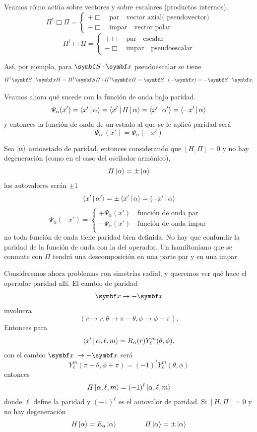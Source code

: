 \documentclass[10pt,oneside]{CBFT_book}
\begin{document}
Veamos cómo actúa sobre vectores y sobre escalares (productos internos),
\[
	\Pi^\dagger \Box \Pi =  \begin{cases} +{\Box} \quad \text{par}\quad\text{vector axial( 
	pseudovector)}\\  -\Box \quad \text{impar} \quad \text{vector polar} \end{cases}
\]
\[
	\Pi^\dagger \Box \Pi =  \begin{cases} +\Box \quad \text{par}\quad\text{escalar}\\
	-\Box \quad \text{impar} \quad \text{pseudoescalar} \end{cases}
\]

Así, por ejemplo, para $\vb{S}\cdot\vb{x}$ pseudoescalar se tiene
\[
	\Pi^\dagger \vb{S}\cdot\vb{x} \Pi = \Pi^\dagger \vb{S}\Pi \cdot\Pi^\dagger\vb{x} \Pi =
	\vb{S}\cdot(-\vb{x}) = -\vb{S}\cdot\vb{x}.
\]

Veamos ahora qué sucede con la función de onda bajo paridad.
\[
	\Psi_\alpha(x') = \Braket{x'|\alpha} = \Braket{x'|\Pi|\alpha} = \Braket{x'|\alpha'} = 
	\Braket{-x'|\alpha}
\]
y entonces la función de onda de un estado al que se le aplicó paridad será 
\[
	\Psi_{\alpha'}(x') = \Psi_\alpha(-x')
\]

Sea $\Ket{\alpha}$ autoestado de paridad, entonces considerando que $ [ H, \Pi] = 0 $ y no hay
degeneración (como en el caso del oscilador armónico),
\[
	\Pi\Ket{\alpha} = \pm \Ket{\alpha}
\]
los autovalores serán $\pm 1$
\[
	\Braket{x'|\alpha'} = \pm \Braket{x'|\alpha} = \Braket{-x'|\alpha} 
\]
\[
	\Psi_\alpha(-x') = \begin{cases} +\Psi_\alpha(x') \quad \text{función de onda par}\\ 
	-\Psi_\alpha(x') \quad \text{función de onda impar}\\ 
	\end{cases}
\]
no toda función de onda tiene paridad bien definida.
No hay que confundir la paridad de la función de onda con la del operador.
Un hamiltoniano que se conmute con $\Pi$ tendrá una descomposición en una parte par y en una impar.

Consideremos ahora problemas con simetrías radial, y queremos ver qué hace el operador paridad allí.
El cambio de paridad 
\[
	\vb{x} \to -\vb{x} 
\]
involucra
\[
	\left( r\to r, \theta \to \pi-\theta, \phi \to \phi+\pi \right).
\]
Entonces para
\[
	\Braket{x'|\alpha,\ell,m} = R_\alpha(r) Y_\ell^m(\theta,\phi), 
\]
con el cambio $ \vb{x} \; \to -\vb{x} $ será
\[
	Y_\ell^m(\pi-\theta,\phi+\pi) = (-1)^\ell Y_\ell^m(\theta,\phi)
\]
entonces
\[
	\Pi\Ket{\alpha,\ell,m} =  (-1)^\ell \Ket{\alpha,\ell,m}
\]
donde $\ell$ define la paridad y $(-1)^\ell$ es el autovalor de paridad.
Si $[H,\Pi] = 0$ y no hay degeneración
\[
	H \Ket{\alpha} = E_{\alpha} \Ket{\alpha} \qquad \qquad \Pi \Ket{\alpha} = \pm \Ket{\alpha}
\]
\end{document}
